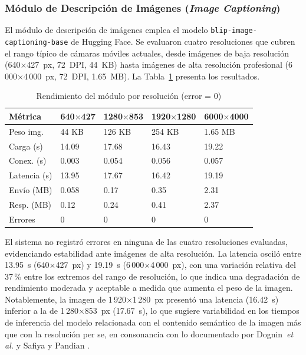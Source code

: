 \documentclass[journal]{IEEEtran}
\begin{document}
			\subsubsection{M\'odulo de Descripci\'on de Im\'agenes (\textit{Image Captioning})}
				El m\'odulo de descripci\'on de im\'agenes emplea el modelo \texttt{blip-image-captioning-base} de Hugging Face. Se evaluaron cuatro resoluciones que cubren el rango t\'ipico de c\'amaras m\'oviles actuales, desde im\'agenes de baja resoluci\'on (640$\times$427~px, 72~DPI, 44~KB) hasta im\'agenes de alta resoluci\'on profesional (6\,000$\times$4\,000~px, 72~DPI, 1.65~MB). La Tabla~\ref{tab:img} presenta los resultados.
				
				\begin{table}[!t]
					\caption{Rendimiento del módulo por resolución (error = 0)}
					\label{tab:img}
					\centering
					\renewcommand{\arraystretch}{1.15}
					\begin{tabularx}{\columnwidth}{lXXXX}
						\toprule
						\textbf{Métrica} & \textbf{640$\times$427} & \textbf{1280$\times$853} & \textbf{1920$\times$1280} & \textbf{6000$\times$4000} \\
						\midrule
						Peso img.        & 44 KB  & 126 KB & 254 KB & 1.65 MB \\
						Carga (s)        & 14.09  & 17.68  & 16.43  & 19.22  \\
						Conex. (s)       & 0.003  & 0.054  & 0.056  & 0.057  \\
						Latencia (s)     & 13.95  & 17.67  & 16.42  & 19.19  \\
						Envío (MB)       & 0.058  & 0.17   & 0.35   & 2.31   \\
						Resp. (MB)       & 0.12   & 0.24   & 0.41   & 2.37   \\
						Errores          & 0      & 0      & 0      & 0      \\
						\bottomrule
					\end{tabularx}
				\end{table}
				El sistema no registr\'o errores en ninguna de las cuatro resoluciones evaluadas, evidenciando estabilidad ante im\'agenes de alta resoluci\'on. La latencia oscil\'o entre 13.95~s (640$\times$427~px) y 19.19~s (6\,000$\times$4\,000~px), con una variaci\'on relativa del 37\,\% entre los extremos del rango de resoluci\'on, lo que indica una degradaci\'on de rendimiento moderada y aceptable a medida que aumenta el peso de la imagen. Notablemente, la imagen de 1\,920$\times$1\,280~px present\'o una latencia (16.42~s) inferior a la de 1\,280$\times$853~px (17.67~s), lo que sugiere variabilidad en los tiempos de inferencia del modelo relacionada con el contenido sem\'antico de la imagen m\'as que con la resoluci\'on per se, en consonancia con lo documentado por Dognin~\textit{et al.} \cite{dognin2021} y Safiya y Pandian \cite{safiya2024}.
				
\end{document}
